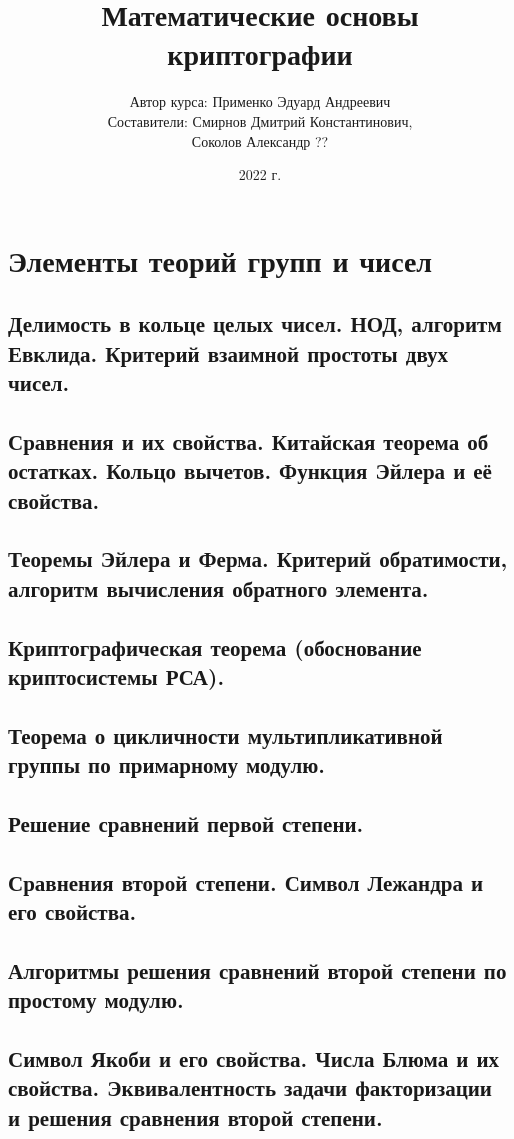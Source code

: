 \documentclass[a4paper,11pt,openany]{book}
\title{Математические основы криптографии}
\author{Автор курса: Применко Эдуард Андреевич \\ 
		Составители: Смирнов Дмитрий Константинович, \\
					 Соколов Александр ??}
\date{2022 г.}
\begin{document}
\maketitle
\tableofcontents

\mainmatter
\chapter{Элементы теорий групп и чисел}
\section{Делимость в кольце целых чисел. НОД, алгоритм Евклида. Критерий взаимной простоты двух чисел.}
\section{Сравнения и их свойства. Китайская теорема об остатках. Кольцо вычетов. Функция Эйлера и её свойства.}
\section{Теоремы Эйлера и Ферма. Критерий обратимости, алгоритм вычисления обратного элемента.}
\section{Криптографическая теорема (обоснование криптосистемы РСА).}
\section{Теорема о цикличности мультипликативной группы по примарному модулю.}
\section{Решение сравнений первой степени.}
\section{Сравнения второй степени. Символ Лежандра и его свойства.}
\section{Алгоритмы решения сравнений второй степени по простому модулю.}
\section{Символ Якоби и его свойства. Числа Блюма и их свойства. Эквивалентность задачи факторизации и решения сравнения второй степени.}
\end{document}
